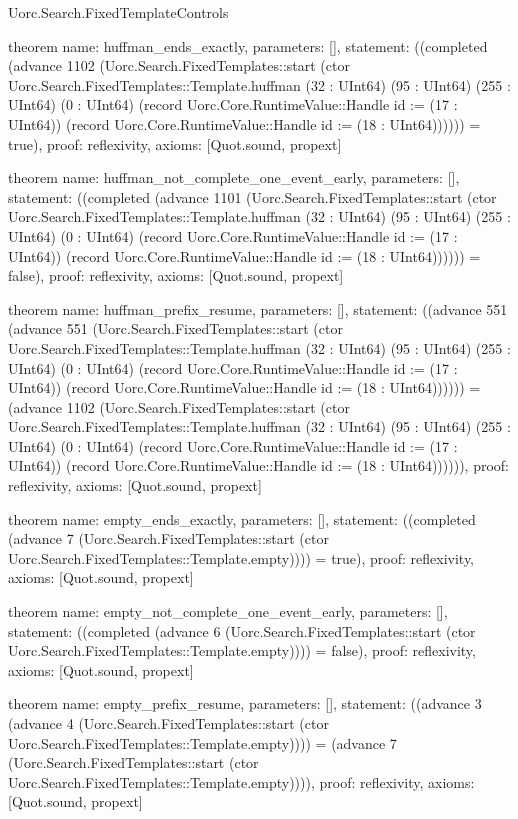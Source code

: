 \begin{lexlean}{Uorc.Search.FixedTemplateControls}
\begin{semanticmodule}
theorem{
  name: huffman_ends_exactly,
  parameters: [],
  statement: ((completed (advance 1102 (Uorc.Search.FixedTemplates::start (ctor Uorc.Search.FixedTemplates::Template.huffman (32 : UInt64) (95 : UInt64) (255 : UInt64) (0 : UInt64) (record Uorc.Core.RuntimeValue::Handle {id := (17 : UInt64)}) (record Uorc.Core.RuntimeValue::Handle {id := (18 : UInt64)}))))) = true),
  proof: reflexivity{},
  axioms: [Quot.sound, propext]
}

theorem{
  name: huffman_not_complete_one_event_early,
  parameters: [],
  statement: ((completed (advance 1101 (Uorc.Search.FixedTemplates::start (ctor Uorc.Search.FixedTemplates::Template.huffman (32 : UInt64) (95 : UInt64) (255 : UInt64) (0 : UInt64) (record Uorc.Core.RuntimeValue::Handle {id := (17 : UInt64)}) (record Uorc.Core.RuntimeValue::Handle {id := (18 : UInt64)}))))) = false),
  proof: reflexivity{},
  axioms: [Quot.sound, propext]
}

theorem{
  name: huffman_prefix_resume,
  parameters: [],
  statement: ((advance 551 (advance 551 (Uorc.Search.FixedTemplates::start (ctor Uorc.Search.FixedTemplates::Template.huffman (32 : UInt64) (95 : UInt64) (255 : UInt64) (0 : UInt64) (record Uorc.Core.RuntimeValue::Handle {id := (17 : UInt64)}) (record Uorc.Core.RuntimeValue::Handle {id := (18 : UInt64)}))))) = (advance 1102 (Uorc.Search.FixedTemplates::start (ctor Uorc.Search.FixedTemplates::Template.huffman (32 : UInt64) (95 : UInt64) (255 : UInt64) (0 : UInt64) (record Uorc.Core.RuntimeValue::Handle {id := (17 : UInt64)}) (record Uorc.Core.RuntimeValue::Handle {id := (18 : UInt64)}))))),
  proof: reflexivity{},
  axioms: [Quot.sound, propext]
}

theorem{
  name: empty_ends_exactly,
  parameters: [],
  statement: ((completed (advance 7 (Uorc.Search.FixedTemplates::start (ctor Uorc.Search.FixedTemplates::Template.empty)))) = true),
  proof: reflexivity{},
  axioms: [Quot.sound, propext]
}

theorem{
  name: empty_not_complete_one_event_early,
  parameters: [],
  statement: ((completed (advance 6 (Uorc.Search.FixedTemplates::start (ctor Uorc.Search.FixedTemplates::Template.empty)))) = false),
  proof: reflexivity{},
  axioms: [Quot.sound, propext]
}

theorem{
  name: empty_prefix_resume,
  parameters: [],
  statement: ((advance 3 (advance 4 (Uorc.Search.FixedTemplates::start (ctor Uorc.Search.FixedTemplates::Template.empty)))) = (advance 7 (Uorc.Search.FixedTemplates::start (ctor Uorc.Search.FixedTemplates::Template.empty)))),
  proof: reflexivity{},
  axioms: [Quot.sound, propext]
}


\end{semanticmodule}
\end{lexlean}

